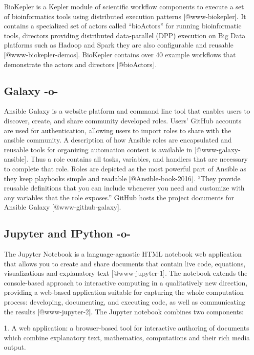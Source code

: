 BioKepler is a Kepler module of scientific workflow components to
execute a set of bioinformatics tools using distributed execution
patterns [@www-biokepler]. It contains a specialized set of actors
called ``bioActors'' for running bioinformatic tools, directors
providing distributed data-parallel (DPP) execution on Big Data
platforms such as Hadoop and Spark they are also configurable and
reusable [@www-biokepler-demos]. BioKepler contains over 40
example workflows that demonstrate the actors and
directors [@bioActors].


    
\subsection{Galaxy -o-}

Ansible Galaxy is a website platform and command line tool that
enables users to discover, create, and share community developed
roles. Users' GitHub accounts are used for authentication, allowing
users to import roles to share with the ansible community. A
description of how Ansible roles are encapsulated and reusable tools
for organizing automation content is available
in [@www-galaxy-ansible]. Thus a role contains all tasks,
variables, and handlers that are necessary to complete that
role. Roles are depicted as the most powerful part of Ansible as they
keep playbooks simple and readable [@Ansible-book-2016]. ``They
provide reusable definitions that you can include whenever you need
and customize with any variables that the role exposes.'' GitHub hosts
the project documents for Ansible Galaxy [@www-github-galaxy].




\subsection{Jupyter and IPython -o-}

The Jupyter Notebook is a language-agnostic HTML notebook web
application that allows you to create and share documents that contain
live code, equations, visualizations and explanatory
text [@www-jupyter-1]. The notebook extends the console-based
approach to interactive computing in a qualitatively new direction,
providing a web-based application suitable for capturing the whole
computation process: developing, documenting, and executing code, as
well as communicating the results [@www-jupyter-2]. The Jupyter
notebook combines two components:
    
1. A web application: a browser-based tool for interactive authoring
of documents which combine explanatory text, mathematics, computations
and their rich media output.

